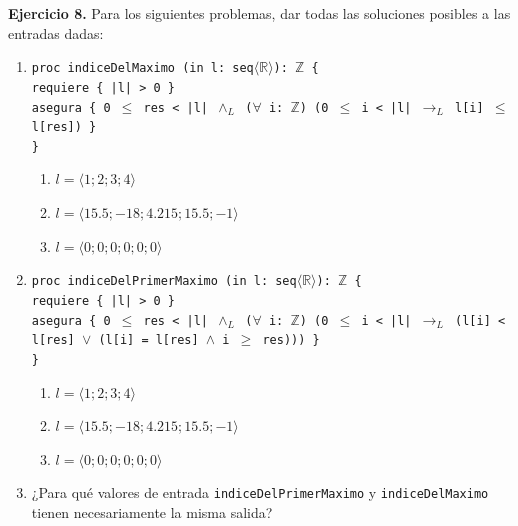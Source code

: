 \hypertarget{ej8}{}
\noindent \textbf{Ejercicio 8.} Para los siguientes problemas, dar todas las soluciones posibles a las entradas dadas:

\begin{enumerate}[label=\textbf{\alph*)}]
    \item \texttt{proc indiceDelMaximo (in l: seq$\langle\mathbb{R}\rangle$): $\mathbb{Z}$ \{} \\
    \texttt{\hspace*{0.5cm}requiere \{ |l| > 0 \}} \\
    \texttt{\hspace*{0.5cm}asegura \{ 0 $\leq$ res < |l| $\wedge_L$ ($\forall$ i: $\mathbb{Z}$) (0 $\leq$ i < |l| $\rightarrow_L$ l[i] $\leq$ l[res]) \}} \\
    \texttt{\}}
    \begin{enumerate}[label=\roman*)]
        \item $l = \langle 1 ; 2 ; 3 ; 4 \rangle$
        \item $l = \langle 15.5 ; -18 ; 4.215 ; 15.5 ; -1 \rangle$
        \item $l = \langle 0 ; 0 ; 0 ; 0 ; 0 ; 0 \rangle$
    \end{enumerate}

    \vspace{0.4cm}
    \item \texttt{proc indiceDelPrimerMaximo (in l: seq$\langle\mathbb{R}\rangle$): $\mathbb{Z}$ \{} \\
    \texttt{\hspace*{0.5cm}requiere \{ |l| > 0 \}} \\
    \texttt{\hspace*{0.5cm}asegura \{ 0 $\leq$ res < |l| $\wedge_L$ ($\forall$ i: $\mathbb{Z}$) (0 $\leq$ i < |l| $\rightarrow_L$ (l[i] < l[res] $\vee$ (l[i] = l[res] $\wedge$ i $\geq$ res))) \}} \\
    \texttt{\}}
    \begin{enumerate}[label=\roman*)]
        \item $l = \langle 1 ; 2 ; 3 ; 4 \rangle$
        \item $l = \langle 15.5 ; -18 ; 4.215 ; 15.5 ; -1 \rangle$
        \item $l = \langle 0 ; 0 ; 0 ; 0 ; 0 ; 0 \rangle$
    \end{enumerate}

    \vspace{0.4cm}
    \item ¿Para qué valores de entrada \texttt{indiceDelPrimerMaximo} y \texttt{indiceDelMaximo} tienen necesariamente la misma salida?
\end{enumerate}

